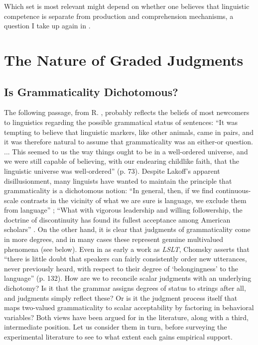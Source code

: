Which set is most relevant might depend on whether one believes that linguistic competence is separate from production and comprehension mechanisms, a question I take up again in .

\section{The Nature of Graded Judgments}\label{sec:3.3}
\subsection{Is Grammaticality  Dichotomous?}\label{sec:3.3.1}

The following passage, from R. \citet{Lakoff1977}, probably reflects the beliefs of most newcomers to linguistics regarding the possible grammatical status of sentences: ``It was tempting to believe that linguistic markers, like other animals, came in pairs, and it was therefore natural to assume that grammaticality was an either-or question. ... This seemed to us the way things ought to be in a well-ordered universe, and we were still capable of believing, with our endearing childlike faith, that the linguistic universe was well-ordered'' (p. 73). Despite Lakoff's apparent disillusionment, many linguists have wanted to maintain the principle that grammaticality is a dichotomous notion: ``In general, then, if we find continuous-scale contrasts in the vicinity of what we are sure is language, we exclude them from language'' \citep[17]{Hockett1955}; ``What with vigorous leadership and willing followership, the doctrine of discontinuity has found its fullest acceptance among American scholars'' \citep[2]{Bolinger1961}. On the other hand, it is clear that judgments of grammaticality come in more degrees, and in many cases these represent genuine multivalued phenomena (see below). Even in as early a work as \textit{LSLT}, Chomsky asserts that ``there is little doubt that speakers can fairly consistently order new utterances, never previously heard, with respect to their degree of `belongingness' to the language'' (p. 132). How are we to reconcile scalar judgments with an underlying dichotomy? Is it that the grammar assigns degrees of status to strings after all, and judgments simply reflect these? Or is it the judgment process itself that maps two-valued grammaticality to scalar acceptability by factoring in behavioral variables? Both views have been argued for in the literature, along with a third, intermediate position. Let us consider them in turn, before surveying the experimental literature to see to what extent each gains empirical support.

